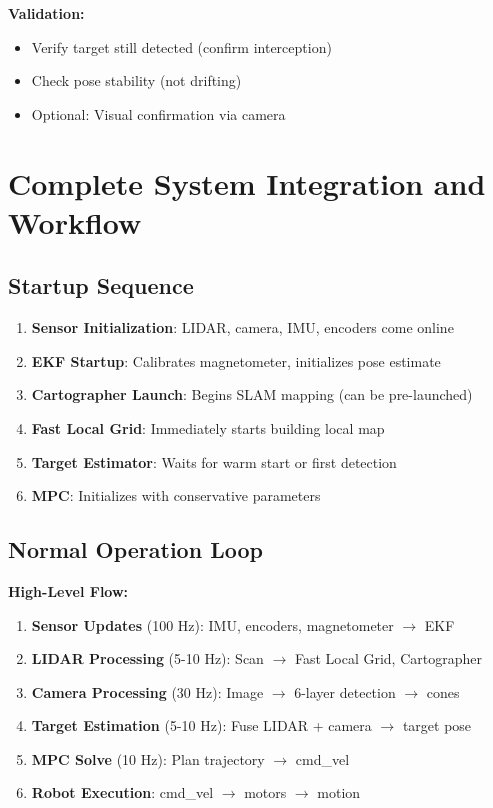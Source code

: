 \documentclass[11pt]{article}
\begin{document}
\textbf{Validation:}
\begin{itemize}
    \item Verify target still detected (confirm interception)
    \item Check pose stability (not drifting)
    \item Optional: Visual confirmation via camera
\end{itemize}

\section{Complete System Integration and Workflow}

\subsection{Startup Sequence}

\begin{enumerate}
    \item \textbf{Sensor Initialization}: LIDAR, camera, IMU, encoders come online
    \item \textbf{EKF Startup}: Calibrates magnetometer, initializes pose estimate
    \item \textbf{Cartographer Launch}: Begins SLAM mapping (can be pre-launched)
    \item \textbf{Fast Local Grid}: Immediately starts building local map
    \item \textbf{Target Estimator}: Waits for warm start or first detection
    \item \textbf{MPC}: Initializes with conservative parameters
\end{enumerate}

\subsection{Normal Operation Loop}

\textbf{High-Level Flow:}
\begin{enumerate}
    \item \textbf{Sensor Updates} (100 Hz): IMU, encoders, magnetometer $\rightarrow$ EKF
    \item \textbf{LIDAR Processing} (5-10 Hz): Scan $\rightarrow$ Fast Local Grid, Cartographer
    \item \textbf{Camera Processing} (30 Hz): Image $\rightarrow$ 6-layer detection $\rightarrow$ cones
    \item \textbf{Target Estimation} (5-10 Hz): Fuse LIDAR + camera $\rightarrow$ target pose
    \item \textbf{MPC Solve} (10 Hz): Plan trajectory $\rightarrow$ cmd\_vel
    \item \textbf{Robot Execution}: cmd\_vel $\rightarrow$ motors $\rightarrow$ motion
\end{enumerate}
\end{document}
